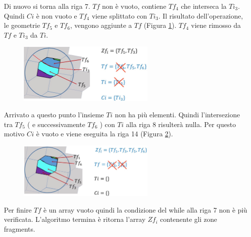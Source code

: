 Di nuovo si torna alla riga 7. $Tf$ non è vuoto, contiene $Tf_4$ che interseca la $Ti_3$. Quindi $Ci$ è non vuoto e $Tf_4$ viene splittato con $Ti_3$. Il risultato dell'operazione, le geometrie $Tf_5$ e $Tf_6$, vengono aggiunte a $Tf$ (Figura \ref{pseudo6}). $Tf_4$ viene rimosso da $Tf$ e $Ti_3$ da $Ti$. 

\begin{figure}[h]
	\centering
	\includegraphics[width=0.6\textwidth]{images/pseudo6}
	\caption{}
	\label{pseudo6}
\end{figure}

Arrivato a questo punto l'insieme $Ti$ non ha più elementi. Quindi l'intersezione tra $Tf_5$ ( e successivamente $Tf_6$ ) con $Ti$ alla riga 8 risulterà nulla. Per questo motivo $Ci$ è vuoto e viene eseguita la riga 14 (Figura \ref{pseudo7}).

\begin{figure}[h]
	\centering
	\includegraphics[width=0.6\textwidth]{images/pseudo7}
	\caption{}
	\label{pseudo7}
\end{figure}

Per finire $Tf$ è un array vuoto quindi la condizione del while alla riga 7 non è più verificata. L'algoritmo termina è ritorna l'array $Zf_i$ contenente gli zone fragments.

\newpage
	

